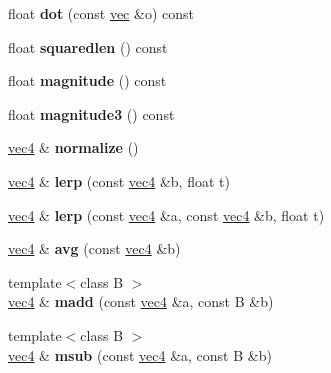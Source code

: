 \begin{DoxyCompactItemize}
\item 
\mbox{\label{structvec4_a73ce2f1c3dcb38610ba46b3dc55abdfc}} 
float {\bfseries dot} (const \hyperlink{structvec}{vec} \&o) const
\item 
\mbox{\label{structvec4_a4c47b12d19a5fffa1d112f2edbd8ef69}} 
float {\bfseries squaredlen} () const
\item 
\mbox{\label{structvec4_a37dcfab774da4b34980422e01767064c}} 
float {\bfseries magnitude} () const
\item 
\mbox{\label{structvec4_a708c3c127f6c5d97164ba8f8523b5bbd}} 
float {\bfseries magnitude3} () const
\item 
\mbox{\label{structvec4_a8c17bd2d743d98a8789122953e00402e}} 
\hyperlink{structvec4}{vec4} \& {\bfseries normalize} ()
\item 
\mbox{\label{structvec4_a6be099ae50ee186c289f76993510a892}} 
\hyperlink{structvec4}{vec4} \& {\bfseries lerp} (const \hyperlink{structvec4}{vec4} \&b, float t)
\item 
\mbox{\label{structvec4_ad5fb526eaf4afec9e9b1a6cd729c1593}} 
\hyperlink{structvec4}{vec4} \& {\bfseries lerp} (const \hyperlink{structvec4}{vec4} \&a, const \hyperlink{structvec4}{vec4} \&b, float t)
\item 
\mbox{\label{structvec4_a221ae49b825f191c1007646d6e267f2a}} 
\hyperlink{structvec4}{vec4} \& {\bfseries avg} (const \hyperlink{structvec4}{vec4} \&b)
\item 
\mbox{\label{structvec4_af493f076253d054434244c92d6135f98}} 
{\footnotesize template$<$class B $>$ }\\\hyperlink{structvec4}{vec4} \& {\bfseries madd} (const \hyperlink{structvec4}{vec4} \&a, const B \&b)
\item 
\mbox{\label{structvec4_aec7aedaa749158c51d4880ed48bdd244}} 
{\footnotesize template$<$class B $>$ }\\\hyperlink{structvec4}{vec4} \& {\bfseries msub} (const \hyperlink{structvec4}{vec4} \&a, const B \&b)
\item 

\end{DoxyCompactItemize}
